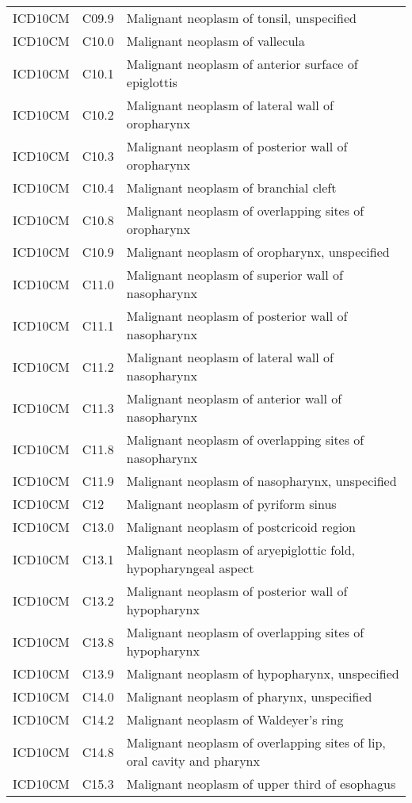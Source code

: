 \begin{longtable}{p{}p{}p{}}
  ICD10CM & C09.9 & Malignant neoplasm of tonsil, unspecified \\ 
  ICD10CM & C10.0 & Malignant neoplasm of vallecula \\ 
  ICD10CM & C10.1 & Malignant neoplasm of anterior surface of epiglottis \\ 
  ICD10CM & C10.2 & Malignant neoplasm of lateral wall of oropharynx \\ 
  ICD10CM & C10.3 & Malignant neoplasm of posterior wall of oropharynx \\ 
  ICD10CM & C10.4 & Malignant neoplasm of branchial cleft \\ 
  ICD10CM & C10.8 & Malignant neoplasm of overlapping sites of oropharynx \\ 
  ICD10CM & C10.9 & Malignant neoplasm of oropharynx, unspecified \\ 
  ICD10CM & C11.0 & Malignant neoplasm of superior wall of nasopharynx \\ 
  ICD10CM & C11.1 & Malignant neoplasm of posterior wall of nasopharynx \\ 
  ICD10CM & C11.2 & Malignant neoplasm of lateral wall of nasopharynx \\ 
  ICD10CM & C11.3 & Malignant neoplasm of anterior wall of nasopharynx \\ 
  ICD10CM & C11.8 & Malignant neoplasm of overlapping sites of nasopharynx \\ 
  ICD10CM & C11.9 & Malignant neoplasm of nasopharynx, unspecified \\ 
  ICD10CM & C12 & Malignant neoplasm of pyriform sinus \\ 
  ICD10CM & C13.0 & Malignant neoplasm of postcricoid region \\ 
  ICD10CM & C13.1 & Malignant neoplasm of aryepiglottic fold, hypopharyngeal aspect \\ 
  ICD10CM & C13.2 & Malignant neoplasm of posterior wall of hypopharynx \\ 
  ICD10CM & C13.8 & Malignant neoplasm of overlapping sites of hypopharynx \\ 
  ICD10CM & C13.9 & Malignant neoplasm of hypopharynx, unspecified \\ 
  ICD10CM & C14.0 & Malignant neoplasm of pharynx, unspecified \\ 
  ICD10CM & C14.2 & Malignant neoplasm of Waldeyer's ring \\ 
  ICD10CM & C14.8 & Malignant neoplasm of overlapping sites of lip, oral cavity and pharynx \\ 
  ICD10CM & C15.3 & Malignant neoplasm of upper third of esophagus \\ 

\end{longtable}
